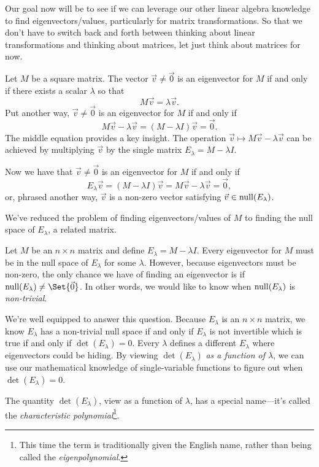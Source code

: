 Our goal now will be to see if we can leverage our other linear algebra knowledge to find eigenvectors/values,
particularly for matrix transformations. So that we don't have to switch back and forth
between thinking about linear transformations and thinking about matrices, let just think about matrices for now.

Let $M$ be a square matrix. The vector $\vec v\neq \vec 0$
is an eigenvector for $M$ if and only if there exists a scalar $\lambda$ so that
\begin{equation}
	\label{EQEIGEN}
	M\vec v=\lambda \vec v.
\end{equation}
Put another way, $\vec v\neq \vec 0$ is an eigenvector for $M$ if and only if
\[
	M\vec v-\lambda \vec v=(M-\lambda I)\vec v=\vec 0.
\]
The middle equation provides a key insight. The operation $\vec v\mapsto M\vec v-\lambda\vec v$ can be achieved
by multiplying $\vec v$ by the single matrix $E_\lambda=M-\lambda I$.

Now we have that $\vec v\neq \vec 0$ is an eigenvector for $M$ if and only if
\[
	E_\lambda \vec v=(M-\lambda I)\vec v = M\vec v-\lambda \vec v=\vec 0,
\]
or, phrased another way, $\vec v$ is a non-zero vector satisfying $\vec v\in \operatorname{null}(E_\lambda)$.

We've reduced the problem of finding eigenvectors/values of $M$ to finding the null space of $E_\lambda$,
a related matrix.


Let $M$ be an $n\times n$ matrix and define $E_\lambda=M-\lambda I$. Every eigenvector for
$M$ must be in the null space of $E_\lambda$ for some $\lambda$. However, because eigenvectors
must be non-zero, the only chance we have of finding an eigenvector is if $\Null(E_\lambda)\neq \Set{\vec 0}$.
In other words, we would like to know when $\operatorname{null}(E_\lambda)$ is \emph{non-trivial}.

We're well equipped to answer this question. Because $E_\lambda$ is an $n\times n$ matrix, we know $E_\lambda$ has
a non-trivial null space if and only if $E_\lambda$ is not invertible which is true if and only if $\det(E_\lambda)=0$.
Every $\lambda$ defines a different $E_\lambda$ where eigenvectors could be hiding. By viewing $\det(E_\lambda)$
\emph{as a function of $\lambda$}, we can use our mathematical knowledge of single-variable functions to 
figure out when $\det(E_\lambda)=0$.

The quantity $\det(E_\lambda)$, view as a function of $\lambda$, has a special name---it's
called the \emph{characteristic polynomial}\footnote{ This time the term is traditionally given the English name, rather
than being called the \emph{eigenpolynomial}.}.

